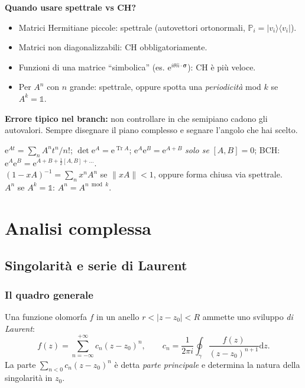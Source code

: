 \documentclass[11pt,a4paper,openany]{book}
\theoremstyle{definition}
\newcommand{\ket}[1]{|#1\rangle}
\newcommand{\bra}[1]{\langle#1|}
\newcommand{\dd}{\mathrm{d}}
\newcommand{\eu}{\mathrm{e}}
\DeclareMathOperator{\Tr}{Tr}
\begin{document}
\begin{trucco}
\textbf{Quando usare spettrale vs CH?}
\begin{itemize}
\item Matrici Hermitiane piccole: spettrale (autovettori ortonormali, $\mathbb P_i=\ket{v_i}\bra{v_i}$).
\item Matrici non diagonalizzabili: CH obbligatoriamente.
\item Funzioni di una matrice ``simbolica'' (es. $\eu^{i\theta\hat n\cdot\bm\sigma}$): CH \`e pi\`u veloce.
\item Per $A^n$ con $n$ grande: spettrale, oppure spotta una \emph{periodicit\`a} mod $k$ se $A^k=\mathbb 1$.
\end{itemize}

\textbf{Errore tipico nel branch:} non controllare in che semipiano cadono gli autovalori. Sempre disegnare il piano complesso e segnare l'angolo che hai scelto.
\end{trucco}

\begin{formulario}
$\eu^{At}=\sum_n A^n t^n/n!$; $\det \eu^A=\eu^{\Tr A}$; $\eu^A\eu^B=\eu^{A+B}$ \emph{solo se} $[A,B]=0$; BCH: $\eu^A\eu^B=\eu^{A+B+\frac 1 2[A,B]+\dots}$.
\\$(1-xA)^{-1}=\sum_n x^n A^n$ se $\|xA\|<1$, oppure forma chiusa via spettrale.
\\$A^n$ se $A^k=\mathbb 1$: $A^n=A^{n\bmod k}$.
\end{formulario}

\part{Analisi complessa}

\chapter{Singolarit\`a e serie di Laurent}\label{ch:laurent}

\section{Il quadro generale}
Una funzione olomorfa $f$ in un anello $r<|z-z_0|<R$ ammette uno sviluppo \emph{di Laurent}:
$$f(z)=\sum_{n=-\infty}^{+\infty}c_n(z-z_0)^n,\qquad c_n=\frac{1}{2\pi i}\oint_\gamma \frac{f(z)}{(z-z_0)^{n+1}}\dd z.$$
La parte $\sum_{n<0}c_n(z-z_0)^n$ \`e detta \emph{parte principale} e determina la natura della singolarit\`a in $z_0$.
\end{document}
